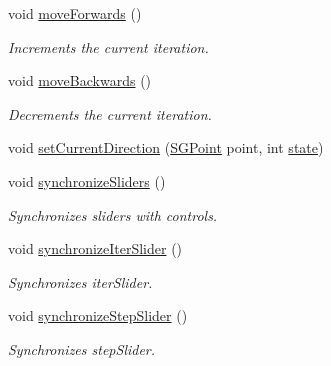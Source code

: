 \begin{DoxyCompactItemize}
\mbox{\label{classSGPlotController__V2_a4d0ea705ead64e8ac7f0622e97180aa4}} 
void \hyperlink{classSGPlotController__V2_a4d0ea705ead64e8ac7f0622e97180aa4}{move\+Forwards} ()
\begin{DoxyCompactList}\small\item\em Increments the current iteration. \end{DoxyCompactList}\item 
\mbox{\label{classSGPlotController__V2_ad59c7e363932f2a45ecdaf933b7bea15}} 
void \hyperlink{classSGPlotController__V2_ad59c7e363932f2a45ecdaf933b7bea15}{move\+Backwards} ()
\begin{DoxyCompactList}\small\item\em Decrements the current iteration. \end{DoxyCompactList}\item 
void \hyperlink{classSGPlotController__V2_a12f98b7e96604eca6480dbdbf68151be}{set\+Current\+Direction} (\hyperlink{classSGPoint}{S\+G\+Point} point, int \hyperlink{classSGPlotController__V2_aed106cdfb461c3358f9ec84883d17364}{state})
\item 
void \hyperlink{classSGPlotController__V2_aefaae1f08f4bfebb55189f4440944eea}{synchronize\+Sliders} ()
\begin{DoxyCompactList}\small\item\em Synchronizes sliders with controls. \end{DoxyCompactList}\item 
\mbox{\label{classSGPlotController__V2_ac805087c35db057f5dc776627cd28421}} 
void \hyperlink{classSGPlotController__V2_ac805087c35db057f5dc776627cd28421}{synchronize\+Iter\+Slider} ()
\begin{DoxyCompactList}\small\item\em Synchronizes iter\+Slider. \end{DoxyCompactList}\item 
\mbox{\label{classSGPlotController__V2_a7039a5a3f9b28249d475f8d38c131ce0}} 
void \hyperlink{classSGPlotController__V2_a7039a5a3f9b28249d475f8d38c131ce0}{synchronize\+Step\+Slider} ()
\begin{DoxyCompactList}\small\item\em Synchronizes step\+Slider. \end{DoxyCompactList}\end{DoxyCompactItemize}
